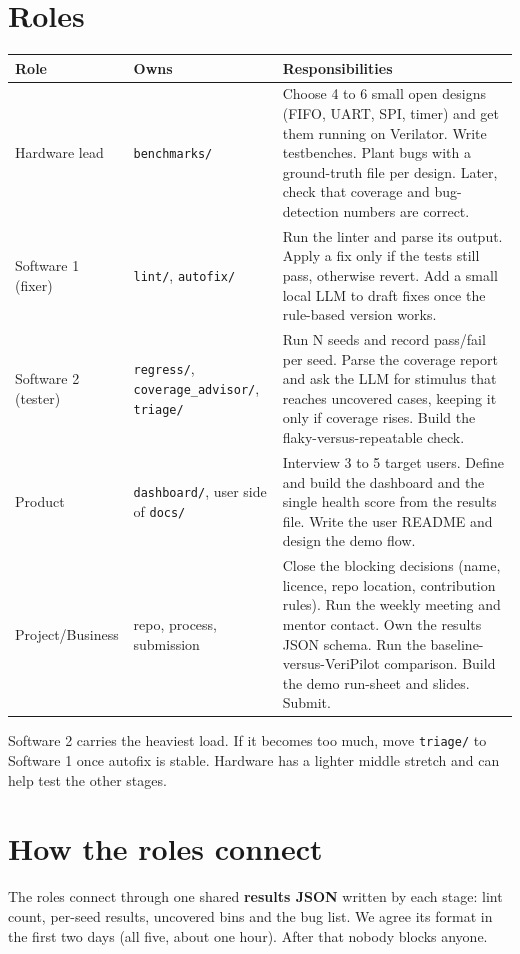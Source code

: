\documentclass[11pt,a4paper]{article}
\begin{document}
\section{Roles}
\begin{longtable}{p{2.6cm} p{3.2cm} p{9.2cm}}
\toprule
\textbf{Role} & \textbf{Owns} & \textbf{Responsibilities} \\
\midrule
\endhead
Hardware lead & \texttt{benchmarks/} & Choose 4 to 6 small open designs (FIFO, UART, SPI, timer) and get them running on Verilator. Write testbenches. Plant bugs with a ground-truth file per design. Later, check that coverage and bug-detection numbers are correct. \\
Software 1 (fixer) & \texttt{lint/}, \texttt{autofix/} & Run the linter and parse its output. Apply a fix only if the tests still pass, otherwise revert. Add a small local LLM to draft fixes once the rule-based version works. \\
Software 2 (tester) & \texttt{regress/}, \texttt{coverage\_advisor/}, \texttt{triage/} & Run N seeds and record pass/fail per seed. Parse the coverage report and ask the LLM for stimulus that reaches uncovered cases, keeping it only if coverage rises. Build the flaky-versus-repeatable check. \\
Product & \texttt{dashboard/}, user side of \texttt{docs/} & Interview 3 to 5 target users. Define and build the dashboard and the single health score from the results file. Write the user README and design the demo flow. \\
Project/Business & repo, process, submission & Close the blocking decisions (name, licence, repo location, contribution rules). Run the weekly meeting and mentor contact. Own the results JSON schema. Run the baseline-versus-VeriPilot comparison. Build the demo run-sheet and slides. Submit. \\
\bottomrule
\end{longtable}

Software 2 carries the heaviest load. If it becomes too much, move \texttt{triage/} to Software 1 once autofix is stable. Hardware has a lighter middle stretch and can help test the other stages.

\section{How the roles connect}
The roles connect through one shared \textbf{results JSON} written by each stage: lint count, per-seed results, uncovered bins and the bug list. We agree its format in the first two days (all five, about one hour). After that nobody blocks anyone.
\end{document}
